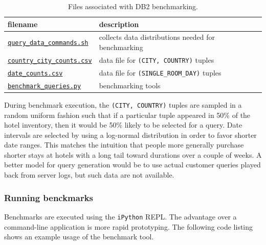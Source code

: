 \documentclass[letterpaper]{article}%
\begin{document}
\begin{table}[h]
  \centering
  \begin{tabular}{ll}
    \toprule
    filename & description \\
    \midrule
    \href{%
      https://github.com/blr246/adbs-reservewithus/blob/master/ReserveWithUsDB/query_data_commands.sh%
    }{\texttt{query\_data\_commands.sh}} & collects data distributions needed for benchmarking \\
    \href{%
      https://raw.github.com/blr246/adbs-reservewithus/master/ReserveWithUsApp/query_data/country_city_counts.csv%
    }{\texttt{country\_city\_counts.csv}} & data file for \texttt{(CITY, COUNTRY)} tuples \\
    \href{%
      https://raw.github.com/blr246/adbs-reservewithus/master/ReserveWithUsApp/query_data/date_counts.csv%
    }{\texttt{date\_counts.csv}} & data file for \texttt{(SINGLE\_ROOM\_DAY)} tuples \\
      \href{%
      https://github.com/blr246/adbs-reservewithus/blob/master/ReserveWithUsApp/benchmark_queries.py%
    }{\texttt{benchmark\_queries.py}} & benchmarking tools \\
    \bottomrule
  \end{tabular}
  \caption{Files associated with DB2 benchmarking.}
  \label{tab:benchmarktools}
\end{table}

During benchmark execution, the \texttt{(CITY, COUNTRY)} tuples are sampled in
a random uniform fashion such that if a particular tuple appeared in 50\% of
the hotel inventory, then it would be 50\% likely to be selected for a query.
Date intervals are selected by using a log-normal distribution in order to
favor shorter date ranges. This matches the intuition that people more
generally purchase shorter stays at hotels with a long tail toward durations
over a couple of weeks. A better model for query generation would be to use
actual customer queries played back from server logs, but such data are not
available.

\subsubsection{Running benckmarks}

Benchmarks are executed using the \texttt{iPython} REPL. The advantage over a
command-line application is more rapid prototyping. The following code listing
shows an example usage of the benchmark tool.
\end{document}
